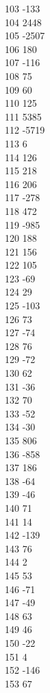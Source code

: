 { 103	-133 \\
 104	2448 \\
 105	-2507 \\
 106	180 \\
 107	-116 \\
 108	75 \\
 109	60 \\
 110	125 \\
 111	5385 \\
 112	-5719 \\
 113	6 \\
 114	126 \\
 115	218 \\
 116	206 \\
 117	-278 \\
 118	472 \\
 119	-985 \\
 120	188 \\
 121	156 \\
 122	105 \\
 123	-69 \\
 124	29 \\
 125	-103 \\
 126	73 \\
 127	-74 \\
 128	76 \\
 129	-72 \\
 130	62 \\
 131	-36 \\
 132	70 \\
 133	-52 \\
 134	-30 \\
 135	806 \\
 136	-858 \\
 137	186 \\
 138	-64 \\
 139	-46 \\
 140	71 \\
 141	14 \\
 142	-139 \\
 143	76 \\
 144	2 \\
 145	53 \\
 146	-71 \\
 147	-49 \\
 148	63 \\
 149	46 \\
 150	-22 \\
 151	4 \\
 152	-146 \\
 153	67 \\
}
